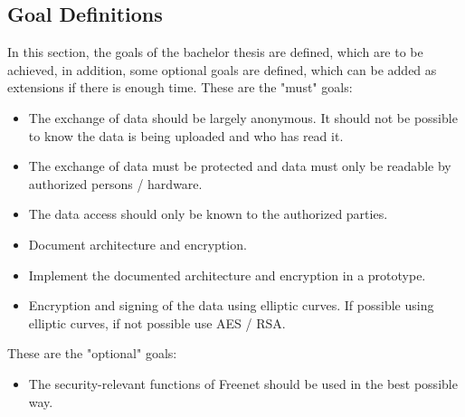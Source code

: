 \subsection{Goal Definitions}
In this section, the goals of the bachelor thesis are defined, which are to be achieved, in addition, some optional goals are defined, which can be added as extensions if there is enough time. 
These are the "must" goals:
\begin{description}
\begin{itemize}
\item
The exchange of data should be largely anonymous. It should not be possible to know the data is being uploaded and who has read it. 
\item
The exchange of data must be protected and data must only be readable by authorized persons / hardware.  
\item
The data access should only be known to the authorized parties.  
\item
Document architecture and encryption.
\item
Implement the documented architecture and encryption in a prototype.
\item
Encryption and signing of the data using elliptic curves. If possible using elliptic curves, if not possible use AES / RSA.
\end{itemize}
\end{description}
\newline
These are the "optional" goals:
\begin{itemize}
\item
The security-relevant functions of Freenet should be used in the best possible way. 
\end{itemize}